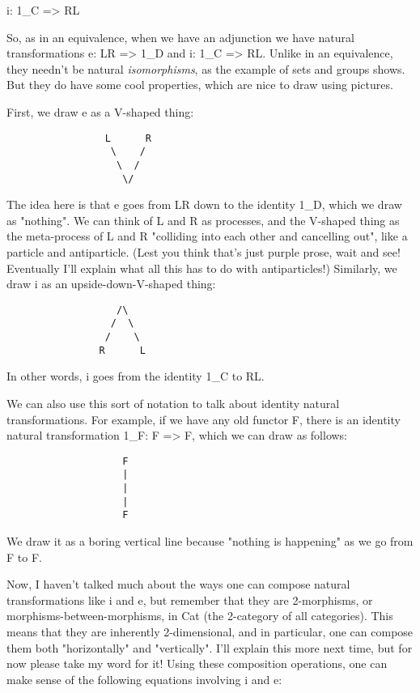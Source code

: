 i: 1_{C} => RL

So, as in an equivalence, when we have an adjunction we have natural
transformations e: LR => 1_{D} and i: 1_{C} => RL.
Unlike in an equivalence, they needn't be natural \emph{isomorphisms},
as the example of sets and groups shows.  But they do have some cool
properties, which are nice to draw using pictures.

First, we draw e as a V-shaped thing:

\begin{verbatim}
                 L      R
                  \    /
                   \  / 
                    \/

\end{verbatim}
    
The idea here is that e goes from LR down to the identity 1_{D}, which we
draw as "nothing".  We can think of L and R as processes, and the
V-shaped thing as the meta-process of L and R "colliding into each other
and cancelling out", like a particle and antiparticle.  (Lest you think
that's just purple prose, wait and see!  Eventually I'll explain what
all this has to do with antiparticles!)  Similarly, we draw i as an
upside-down-V-shaped thing:

\begin{verbatim}
                   /\
                  /  \
                 /    \
                R      L

\end{verbatim}
    
In other words, i goes from the identity 1_{C} to RL.  

We can also use this sort of notation to talk about identity natural
transformations.  For example, if we have any old functor F, there is
an identity natural transformation 1_{F}: F => F, which we can draw as
follows:

\begin{verbatim}
                    F
                    |
                    |
                    |
                    F

\end{verbatim}
    
We draw it as a boring vertical line because "nothing is happening" as
we go from F to F.

Now, I haven't talked much about the ways one can compose natural
transformations like i and e, but remember that they are 2-morphisms,
or morphisms-between-morphisms, in Cat (the 2-category of all
categories).   This means that they are inherently 2-dimensional, and in
particular, one can compose them both "horizontally" and "vertically".
I'll explain this more next time, but for now please take my word for
it!  Using these composition operations, one can make sense of the
following equations involving i and e:
                   
